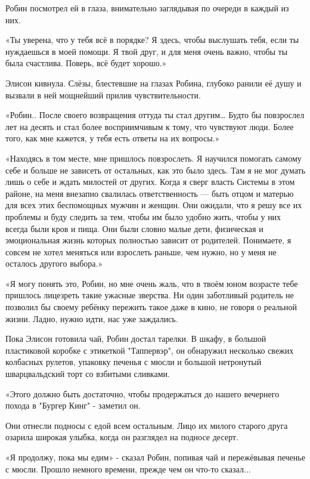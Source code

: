\documentclass[a4paper,12pt]{book}
\begin{document}
\par
Робин посмотрел ей в глаза, внимательно заглядывая по очереди в каждый из них.
\par
«Ты уверена, что у тебя всё в порядке? Я здесь, чтобы выслушать тебя, если ты нуждаешься в моей помощи. Я твой друг, и для меня очень важно, чтобы ты была счастлива. Поверь, всё будет хорошо.»
\par
Элисон кивнула. Слёзы, блестевшие на глазах Робина, глубоко ранили её душу и вызвали в ней мощнейший прилив чувствительности.
\par
«Робин.. После своего возвращения оттуда ты стал другим… Будто бы повзрослел лет на десять и стал более восприимчивым к тому, что чувствуют люди. Более того, как мне кажется, у тебя есть ответы на их вопросы.»
\par
«Находясь в том месте, мне пришлось повзрослеть. Я научился помогать самому себе и больше не зависеть от остальных, как это было здесь. Там я не мог думать лишь о себе и ждать милостей от других. Когда я сверг власть Системы в этом районе, на меня внезапно свалилась ответственность — быть отцом и матерью для всех этих беспомощных мужчин и женщин. Они ожидали, что я решу все их проблемы и буду следить за тем, чтобы им было удобно жить, чтобы у них всегда были кров и пища. Они были словно малые дети, физическая и эмоциональная жизнь которых полностью зависит от родителей. Понимаете, я совсем не хотел меняться или взрослеть раньше, чем нужно, но у меня не осталось другого выбора.»
\par
«Я могу понять это, Робин, но мне очень жаль, что в твоём юном возрасте тебе пришлось лицезреть такие ужасные зверства. Ни один заботливый родитель не позволил бы своему ребёнку пережить такое даже в кино, не говоря о реальной жизни. Ладно, нужно идти, нас уже заждались.\\
\par
Пока Элисон готовила чай, Робин достал тарелки. В шкафу, в большой пластиковой коробке с этикеткой "Таппервэр", он обнаружил несколько свежих колбасных рулетов, упаковку печенья с мюсли и большой нетронутый шварцвальдский торт со взбитыми сливками.
\par
«Этого должно быть достаточно, чтобы продержаться до нашего вечернего похода в "Бургер Кинг" - заметил он.
\par
Они отнесли подносы с едой всем остальным. Лицо их милого старого друга озарила широкая улыбка, когда он разглядел на подносе десерт.
\par
«Я продолжу, пока мы едим» - сказал Робин, попивая чай и пережёвывая печенье с мюсли. Прошло немного времени, прежде чем он что-то сказал...
\end{document}

